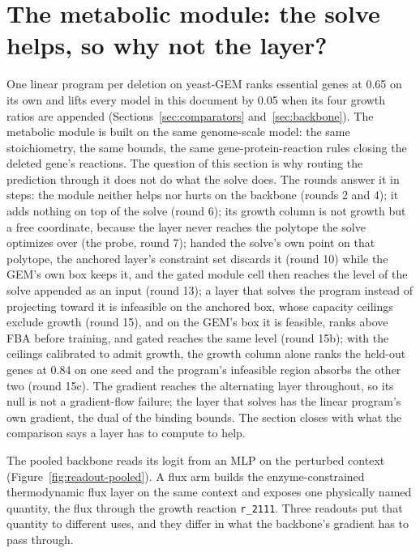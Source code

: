 
\section{The metabolic module: the solve helps, so why not the layer?}
\label{sec:module}

One linear program per deletion on yeast-GEM ranks essential genes at 0.65 on its own and
lifts every model in this document by 0.05 when its four growth ratios are appended
(Sections~\ref{sec:comparators} and~\ref{sec:backbone}). The metabolic module is built on
the same genome-scale model: the same stoichiometry, the same bounds, the same
gene-protein-reaction rules closing the deleted gene's reactions. The question of this
section is why routing the prediction through it does not do what the solve does. The
rounds answer it in steps: the module neither helps nor hurts on the backbone (rounds 2
and 4); it adds nothing on top of the solve (round 6); its growth column is not growth
but a free coordinate, because the layer never reaches the polytope the solve optimizes
over (the probe, round 7); handed the solve's own point on that polytope, the anchored
layer's constraint set discards it (round 10) while the GEM's own box keeps it, and the
gated module cell then reaches the level of the solve appended as an input (round 13);
a layer that solves the program instead of projecting toward it is infeasible on the
anchored box, whose capacity ceilings exclude growth (round 15), and on the GEM's box it
is feasible, ranks above FBA before training, and gated reaches the same level (round
15b); with the ceilings calibrated to admit growth, the growth column alone ranks the
held-out genes at 0.84 on one seed and the program's infeasible region absorbs the other
two (round 15c). The gradient reaches the alternating layer throughout, so its null is
not a gradient-flow failure; the layer that solves has the linear program's own
gradient, the dual of the binding bounds. The section closes with what the comparison
says a layer has to compute to help.

The pooled backbone reads its logit from an MLP on the perturbed context
(Figure~\ref{fig:readout-pooled}). A flux arm builds the enzyme-constrained thermodynamic
flux layer on the same context and exposes one physically named quantity, the flux through
the growth reaction \texttt{r\_2111}. Three readouts put that quantity to different uses,
and they differ in what the backbone's gradient has to pass through.

